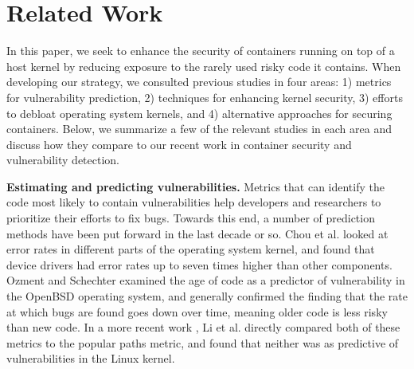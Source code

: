 \section{Related Work}
\label{sec.related_work}
In this paper, we seek to enhance the security of containers running on top of a host kernel by reducing exposure to the rarely used risky code it contains. 
When developing our strategy, we consulted previous studies in four areas: 1) metrics for vulnerability prediction, 2) techniques for enhancing kernel security, 
3) efforts to debloat operating system kernels, and 4) alternative approaches for securing containers. 
Below, we summarize a few of the relevant studies in each area and discuss how they compare to our recent work in container security and vulnerability detection.

\textbf{Estimating and predicting vulnerabilities.} 
Metrics that can identify the code most likely to contain vulnerabilities help developers and researchers to prioritize their efforts to fix bugs. 
Towards this end, a number of prediction methods have been put forward in the last decade or so. Chou et al. \cite{Chou} looked at error rates in different parts of 
the operating system kernel, and found that device drivers had error rates up to seven times higher than other components. Ozment and Schechter \cite{Ozment} examined 
the age of code as a predictor of vulnerability in the OpenBSD \cite{OpenBSD} operating system, and generally confirmed the finding that the rate at which bugs are 
found goes down over time, meaning older code is less risky than new code. In a more recent work \cite{Lock-in-Pop}, 
Li et al. directly compared both of these metrics \cite{Chou, Ozment} to the popular paths metric, and found that neither was as predictive of vulnerabilities in the Linux kernel. 

